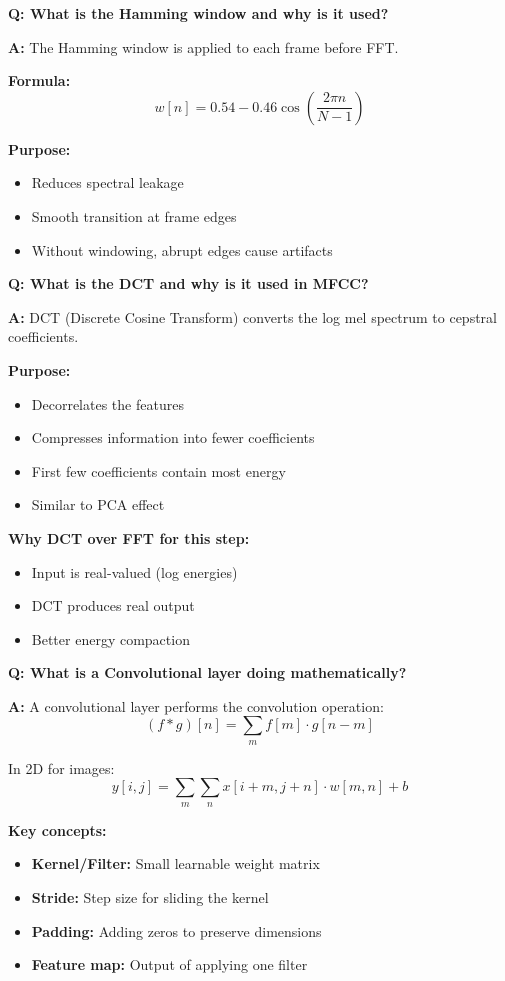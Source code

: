 \documentclass[a4paper,12pt]{article}
\newcommand{\vivaQ}[1]{\textcolor{questioncolor}{\textbf{Q: #1}}}
\newcommand{\vivaA}[1]{\textcolor{answercolor}{\textbf{A:}} #1}
\begin{document}
\vspace{0.5cm}

\vivaQ{What is the Hamming window and why is it used?}

\vivaA{The Hamming window is applied to each frame before FFT.

\textbf{Formula:}
\[w[n] = 0.54 - 0.46 \cos\left(\frac{2\pi n}{N-1}\right)\]

\textbf{Purpose:}
\begin{itemize}
    \item Reduces spectral leakage
    \item Smooth transition at frame edges
    \item Without windowing, abrupt edges cause artifacts
\end{itemize}}

\vspace{0.5cm}

\vivaQ{What is the DCT and why is it used in MFCC?}

\vivaA{DCT (Discrete Cosine Transform) converts the log mel spectrum to cepstral coefficients.

\textbf{Purpose:}
\begin{itemize}
    \item Decorrelates the features
    \item Compresses information into fewer coefficients
    \item First few coefficients contain most energy
    \item Similar to PCA effect
\end{itemize}

\textbf{Why DCT over FFT for this step:}
\begin{itemize}
    \item Input is real-valued (log energies)
    \item DCT produces real output
    \item Better energy compaction
\end{itemize}}

\vspace{0.5cm}

\vivaQ{What is a Convolutional layer doing mathematically?}

\vivaA{A convolutional layer performs the convolution operation:
\[(f * g)[n] = \sum_{m} f[m] \cdot g[n-m]\]

In 2D for images:
\[y[i,j] = \sum_m \sum_n x[i+m, j+n] \cdot w[m,n] + b\]

\textbf{Key concepts:}
\begin{itemize}
    \item \textbf{Kernel/Filter:} Small learnable weight matrix
    \item \textbf{Stride:} Step size for sliding the kernel
    \item \textbf{Padding:} Adding zeros to preserve dimensions
    \item \textbf{Feature map:} Output of applying one filter
\end{itemize}}
\end{document}
